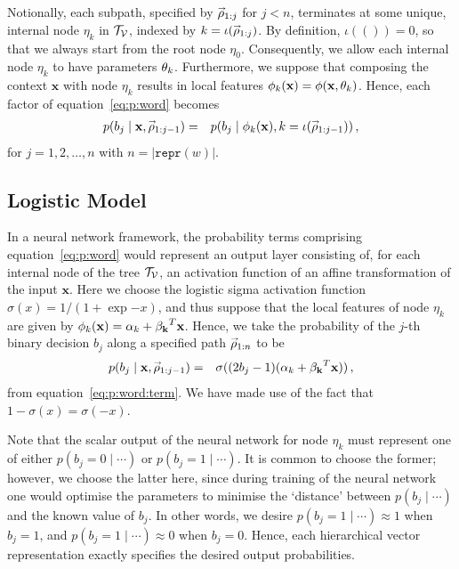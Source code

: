 \documentclass[a4paper]{article}
\newcommand{\rvec}[1]{\accentset{\rightarrow}{#1}}
\begin{document}
Notionally, each subpath, specified by $\rvec{\rho}_{1:j}$ for $j<n$,
terminates at some unique, internal node $\eta_k$ in ${\cal T}_{\cal V}$, indexed by
$k=\iota(\rvec{\rho}_{1:j})$. By definition, $\iota(())=0$, so that we always start from the root node $\eta_0$.
Consequently, we allow each internal node $\eta_k$ to have parameters ${\bf\theta}_k$.
Furthermore, we suppose that composing the context $\textbf{x}$ with node $\eta_k$
results in local features ${\bf\phi}_k({\bf x})={\bf\phi}({\bf x},{\bf\theta}_k)$.
Hence, each factor of equation~\eqref{eq:p:word} becomes
\begin{eqnarray}
p(b_j\;|\;\textbf{x},\rvec{\rho}_{1:j-1}) & = &
p(b_j\;|\;{\bf\phi}_{k}({\bf x}),k=\iota(\rvec{\rho}_{1:j-1}))
\,,
\label{eq:p:word:term}
\end{eqnarray}
for $j=1,2,\ldots,n$ with $n=|\texttt{repr}(w)|$.

\subsection{Logistic Model}

In a neural network framework, the probability terms comprising equation~\eqref{eq:p:word} would represent an output layer
consisting of, for each internal node of the tree ${\cal T}_{\cal V}$, an activation function of an affine transformation of the input $\textbf{x}$.
Here we choose the logistic sigma activation function $\sigma(x)=1/(1+\exp{-x})$, and thus suppose that the local features of node $\eta_k$
are given by ${\bf\phi}_k({\bf x})=\alpha_k + {\bf \beta_k}^{T}{\bf x}$.
Hence, we take the probability of the $j$-th binary decision $b_j$ along a specified path $\rvec{\rho}_{1:n}$ to be
\begin{eqnarray}
p(b_j\;|\;{\bf x},\rvec{\rho}_{1:j-1}) & = & \sigma((2b_j-1)(\alpha_k+{\bf \beta_k}^{T}{\bf x}))\,,
\end{eqnarray}
from equation~\eqref{eq:p:word:term}. We have made use of the fact that $1-\sigma(x)=\sigma(-x)$.

Note that the scalar output of the neural network for node $\eta_k$ must represent one of either $p(b_j=0\;|\;\cdots)$ or
$p(b_j=1\;|\;\cdots)$. It is common to choose the former; however, we choose the latter here, since during training of the neural network
one would optimise the parameters to minimise the `distance' between $p(b_j\;|\;\cdots)$ and the known value of $b_j$.
In other words, we desire $p(b_j=1\;|\;\cdots)\approx 1$ when $b_j=1$, and $p(b_j=1\;|\;\cdots)\approx 0$ when $b_j=0$.
Hence, each hierarchical vector representation exactly specifies the desired output probabilities.
\end{document}

